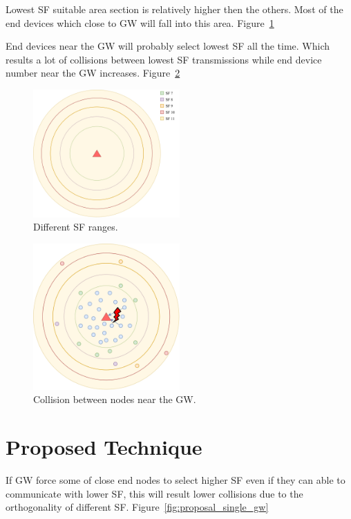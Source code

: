 \documentclass[conference]{IEEEtran}
\begin{document}
\par Lowest SF suitable area section is relatively higher then the others. Most of the end devices which close to GW will fall into this area. Figure~\ref{fig:problem1}

\par End devices near the GW will probably select lowest SF all the time. Which results a lot of collisions between lowest SF transmissions while end device number near the GW increases. Figure~\ref{fig:problem2}

\begin{figure}
\centering
\includegraphics[width=0.5\textwidth]{lora0-1}
\caption{Different SF ranges.}
\label{fig:problem1}
\end{figure}

\begin{figure}
\centering
\includegraphics[width=0.5\textwidth]{lora1-1}
\caption{Collision between nodes near the GW.}
\label{fig:problem2}
\end{figure}


\section{Proposed Technique}
\par If GW force some of close end nodes to select higher SF even if they can able to communicate with lower SF, this will result lower collisions due to the orthogonality of different SF. Figure~\ref{fig:proposal_single_gw}
\end{document}
